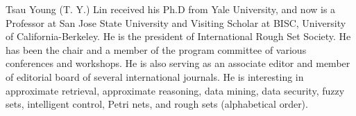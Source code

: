 \documentclass[12pt]{article}
\begin{document}


\noindent Tsau Young (T. Y.) Lin received his Ph.D from Yale University, and now is a
Professor at San Jose State University and Visiting Scholar at BISC, University of California-Berkeley.
He is the president of International Rough Set Society. He has been the chair and a member of the program
committee of various conferences and workshops. He is also serving as an associate editor and member
of editorial board of several international journals. He is interesting in approximate retrieval,
approximate reasoning, data mining, data security, fuzzy sets, intelligent control, Petri nets,
and rough sets (alphabetical order).
\end{document}
